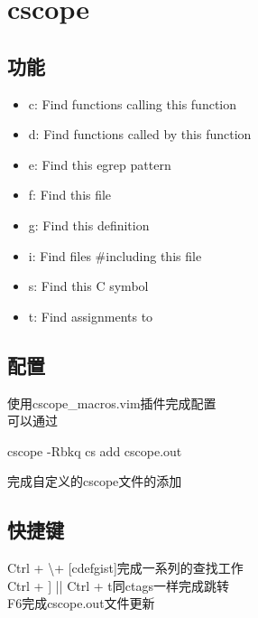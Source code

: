 \chapter{cscope}

\section{功能}
\begin{itemize}
    \item c: Find functions calling this function
    \item d: Find functions called by this function
    \item e: Find this egrep pattern
    \item f: Find this file
    \item g: Find this definition
    \item i: Find files \#including this file
    \item s: Find this C symbol
    \item t: Find assignments to
\end{itemize}

\section{配置}
使用cscope\_macros.vim插件完成配置\\
可以通过
\begin{code}
cscope -Rbkq
cs add cscope.out  
\end{code}
完成自定义的cscope文件的添加

\section{快捷键}
Ctrl + \textbackslash + [cdefgist]完成一系列的查找工作\\
Ctrl + ] || Ctrl + t同ctags一样完成跳转\\
F6完成cscope.out文件更新

\newpage
